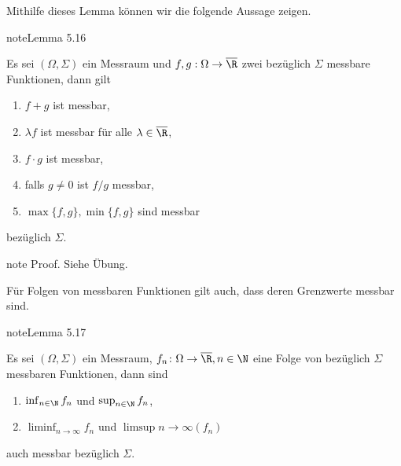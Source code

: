 \documentclass[letterpaper,10pt,german]{jupyterBook}
\begin{document}
\sphinxAtStartPar
Mithilfe dieses Lemma können wir die folgende Aussage zeigen.
\label{masstheorie/lebesgue_integral:lemma-6}
\begin{sphinxadmonition}{note}{Lemma 5.16}



\sphinxAtStartPar
Es sei \((\Omega,\Sigma)\) ein Messraum und \(f,g:\Omega\to\overline{\R}\) zwei bezüglich \(\Sigma\) messbare Funktionen, dann gilt
\begin{enumerate}
%
\item {} 
\sphinxAtStartPar
\(f+g\) ist messbar,

\item {} 
\sphinxAtStartPar
\(\lambda f\) ist messbar für alle \(\lambda\in\overline{\R}\),

\item {} 
\sphinxAtStartPar
\(f\cdot g\) ist messbar,

\item {} 
\sphinxAtStartPar
falls \(g\neq 0\) ist \(f/g\) messbar,

\item {} 
\sphinxAtStartPar
\(\max\{f,g\}, \min\{f,g\}\) sind messbar

\end{enumerate}

\sphinxAtStartPar
bezüglich \(\Sigma\).
\end{sphinxadmonition}

\begin{sphinxadmonition}{note}
\sphinxAtStartPar
Proof. Siehe Übung.
\end{sphinxadmonition}

\sphinxAtStartPar
Für Folgen von messbaren Funktionen gilt auch, dass deren Grenzwerte messbar sind.
\label{masstheorie/lebesgue_integral:lemma-7}
\begin{sphinxadmonition}{note}{Lemma 5.17}



\sphinxAtStartPar
Es sei \((\Omega,\Sigma)\) ein Messraum, \(f_n \colon \Omega\to\overline{\R},n\in\N\) eine Folge von bezüglich \(\Sigma\) messbaren Funktionen, dann sind
\begin{enumerate}
%
\item {} 
\sphinxAtStartPar
\(\inf_{n\in\N} f_n\) und \(\sup_{n\in\N} f_n\),

\item {} 
\sphinxAtStartPar
\(\liminf_{n\to\infty} f_n\) und \(\limsup{n\to\infty} (f_n)\)

\end{enumerate}

\sphinxAtStartPar
auch messbar bezüglich \(\Sigma\).
\end{sphinxadmonition}
\end{document}

